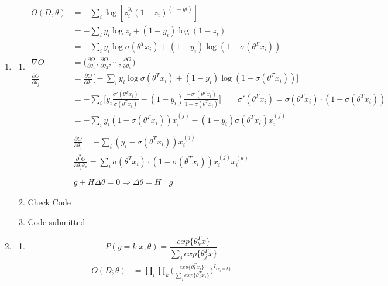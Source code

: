 \documentclass[a4paper]{article}
\begin{document}
\begin{enumerate}
	\item 
	\begin{enumerate}
	\item 
	\begin{align*}
		O(D, \theta) & = -\sum_i \log[z_i^{y_i} (1-z_i)^{(1-yi)}]\\
		& = -\sum_i y_i \log z_i + (1-y_i) \log (1-z_i)\\
		& = -\sum_i y_i \log \sigma(\theta^T x_i) + (1-y_i) \log (1-\sigma(\theta^T x_i))\\
		\nabla  O & = \bigg(\frac{\partial O}{\partial \theta_1}, \frac{\partial O}{\partial \theta_2}, \cdots, \frac{\partial O}{\partial \theta_n} \bigg)\\
		\frac{\partial O}{\partial \theta_j} & = \frac{\partial O}{\partial \theta_1} \bigg[ -\sum_i y_i \log \sigma(\theta^T x_i) + (1-y_i) \log (1-\sigma(\theta^T x_i)) \bigg]\\
		& = -\sum_i \bigg[ y_i \frac{\sigma ' (\theta^T x_i)}{\sigma(\theta^T x_i)} - (1-y_i) \frac{-\sigma ' (\theta^T x_i)}{1-\sigma(\theta^T x_i)} \bigg] \qquad \boxed{\sigma ' (\theta^T x_i) = \sigma(\theta^T x_i)\cdot(1 - \sigma (\theta^T x_i))}\\
		& = -\sum_i y_i (1 - \sigma (\theta^T x_i)) x_i^{(j)} - (1-y_i)\sigma (\theta^T x_i) x_i^{(j)}\\
	\end{align*}
	\begin{gather*}
		\boxed{\frac{\partial O}{\partial \theta_j} = -\sum_i (y_i - \sigma (\theta^T x_i)) x_i^{(j)}}\\
		\boxed{\frac{\partial^2 O}{\partial \theta_j \theta_k} = \sum_i \sigma (\theta^T x_i)\cdot (1-\sigma (\theta^T x_i)) x_i^{(j)} x_i^{(k)}}\\\\
		g + H \Delta \theta = 0 \Longrightarrow \boxed{\Delta \theta = H^{-1}g}
	\end{gather*}
	\item Check Code
	\item Code submitted
	\end{enumerate}
	\item 
	\begin{enumerate}
	\item 
	\begin{equation*}
		P(y = k | x, \theta) = \frac{exp\{ \theta_k^T x\}}{\sum_j exp\{\theta_j^T x\}}
	\end{equation*}
	\begin{align*}
		O(D; \theta) & = \prod_i \prod_k \bigg(\frac{exp\{ \theta_k^T x_i\}}{\sum_j exp\{\theta_j^T x_i\}} \bigg)^{I_{\{y_i = k\}}}\\

\end{align*}
\end{enumerate}
\end{enumerate}
\end{document}
